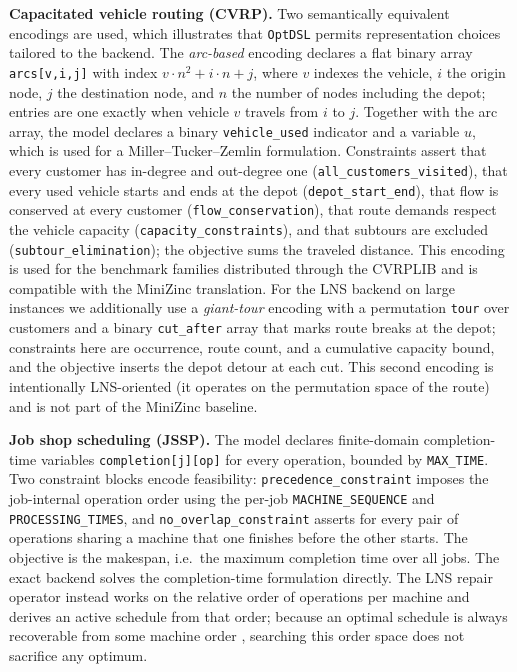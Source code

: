 \documentclass[11pt,a4paper]{article}
\begin{document}
\textbf{Capacitated vehicle routing (CVRP).}
Two semantically equivalent encodings are used, which illustrates that
\texttt{OptDSL} permits representation choices tailored to the backend.
The \emph{arc-based} encoding declares a flat binary array
\texttt{arcs[v,i,j]} with index $v\cdot n^2 + i\cdot n + j$, where $v$
indexes the vehicle, $i$ the origin node, $j$ the destination node, and
$n$ the number of nodes including the depot; entries are one exactly when
vehicle $v$ travels from $i$ to $j$. Together with the arc array, the model
declares a binary \texttt{vehicle\_used} indicator and a variable $u$,
which is used for a Miller--Tucker--Zemlin formulation.
Constraints assert that every customer has in-degree and out-degree one
(\texttt{all\_customers\_visited}), that every used vehicle starts and ends
at the depot (\texttt{depot\_start\_end}), that flow is conserved at every
customer (\texttt{flow\_conservation}), that route demands respect the
vehicle capacity (\texttt{capacity\_constraints}), and that subtours
are excluded (\texttt{subtour\_elimination}); the objective sums the
traveled distance.
This encoding is used for the benchmark families distributed through the
CVRPLIB \citep{uchoa2017cvrplib} and is compatible with the MiniZinc
translation.
For the LNS backend on large instances we additionally use a
\emph{giant-tour} encoding with a permutation \texttt{tour} over customers
and a binary \texttt{cut\_after} array that marks route breaks at the
depot; constraints here are occurrence, route count, and a cumulative
capacity bound, and the objective inserts the depot detour at each cut.
This second encoding is intentionally LNS-oriented (it operates on the
permutation space of the route) and is not part of the MiniZinc baseline.

\textbf{Job shop scheduling (JSSP).}
The model declares finite-domain completion-time variables
\texttt{completion[j][op]} for every operation, bounded by
\texttt{MAX\_TIME}.
Two constraint blocks encode feasibility:
\texttt{precedence\_constraint} imposes the job-internal operation order
using the per-job \texttt{MACHINE\_SEQUENCE} and \texttt{PROCESSING\_TIMES},
and \texttt{no\_overlap\_constraint} asserts for every pair of operations
sharing a machine that one finishes before the other starts.
The objective is the makespan, i.e.\ the maximum completion time over all
jobs.
The exact backend solves the completion-time formulation directly.
The LNS repair operator instead works on the relative order of operations
per machine and derives an active schedule from that order; because an
optimal schedule is always recoverable from some machine order
\citep{applegate1991}, searching this order space does not sacrifice any
optimum.
\end{document}
